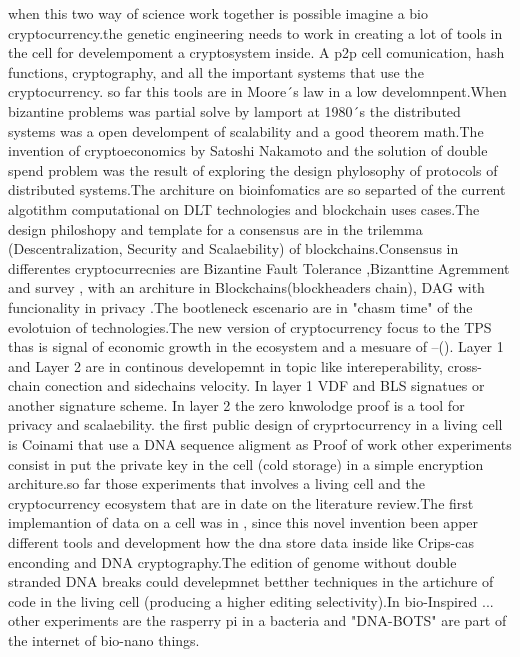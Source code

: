 \documentclass{article}
\begin{document}
when this two way of science work together is possible imagine a bio cryptocurrency.the genetic engineering needs to work in creating a lot of tools in the cell for develempoment a cryptosystem inside. A p2p cell comunication, hash functions, cryptography, and all the important systems that use the cryptocurrency\cite{article2}\cite{8014672}\cite{10.1093/rfs/hhy095}. so far this tools are in Moore´s law\cite{Schaller:1997:MLP:254613.254618} in a low develomnpent.When bizantine problems was partial solve by lamport at 1980´s \cite{Lamport:1982:BGP:357172.357176} the distributed systems was a open develompent of scalability and a good theorem math.The invention of cryptoeconomics by Satoshi Nakamoto\cite{nakamoto2012bitcoin} and the solution of double spend problem was the result of exploring the design phylosophy of protocols of distributed systems\cite{Back02hashcash-}\cite{Dang:2016:PMS:2935634.2935638}.The architure on bioinfomatics are so separted of the current algotithm computational on DLT technologies and blockchain uses cases.The design philoshopy and template for a consensus are in the trilemma (Descentralization, Security and Scalaebility) of blockchains\cite{RePEc:nbr:nberwo:25407}.Consensus\cite{DBLP:journals/corr/abs-1711-03936} in differentes cryptocurrecnies are Bizantine Fault Tolerance \cite{Castro:1999:PBF:296806.296824},Bizanttine Agremment\cite{DBLP:journals/corr/Micali16} and  survey , with an architure in Blockchains(blockheaders chain), DAG\cite{10.1007/978-3-030-13651-2_11} with funcionality in privacy\cite{inproceedingszcash} .The bootleneck escenario\cite{inproceedings}\cite{inproceedings2} are  in "chasm time" of the evolotuion of technologies\cite{Polhill2019}.The new version of cryptocurrency focus to the TPS thas is signal of economic growth in the ecosystem and a mesuare of --(). Layer 1 and Layer 2 are in continous developemnt in topic like intereperability, cross-chain conection and sidechains velocity. In layer 1 VDF and BLS signatues or another signature scheme. In layer 2 the zero knwolodge proof\cite{DBLP:conf/crypto/Ben-SassonBHR19} is a tool for privacy\cite{Kappos:2018:EAA:3277203.3277238} and scalaebility\cite{cryptoeprint:2019:550}. the first public design of cryprtocurrency in a living cell is Coinami\cite{Ileri2016CoinamiAC} that use a DNA  sequence aligment as Proof of work other experiments consist in put the private key in the cell (cold storage) in a simple encryption architure.so far those experiments that involves a living cell and the cryptocurrency ecosystem that are in date on the literature review.The first implemantion of data on a cell was in , since this novel invention been apper different tools and development how the dna store data inside like Crips-cas enconding\cite{Shipman2016MolecularRB} and DNA cryptography\cite{8212786}.The edition of genome without double stranded DNA breaks could develepmnet betther techniques in the artichure of code in the living cell (producing a higher editing selectivity)\cite{article}.In bio-Inspired \cite{Ser2019BioinspiredCW}... other experiments are the rasperry pi in a bacteria \cite{inproceedings423}and  "DNA-BOTS" \cite{Storch832139} are part of the internet of bio-nano things\cite{Akyildiz2015TheIO}.
\end{document}
